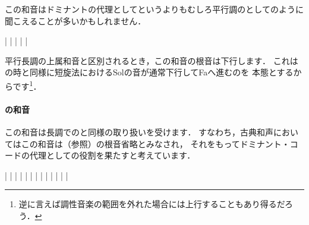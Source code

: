 \documentclass[dvipdfmx,uplatex,b5paper,openany,jbase=12Q,nomag*,textwidth-limit=44%
               ]{gachimuchi}[2020/05/05]
\begin{document}
この和音はドミナントの代理としてというよりもむしろ平行調のとしてのように
聞こえることが多いかもしれません．

\begin{floatMusic}[pos=ht]
  \Startpiece%
  \NOTes
  |%
  \en\bar
  \NOTes
  |%
  \en\bar
  \NOTes
  |%
  \en\setdoublebar
  \endpiece%
\end{floatMusic}

平行長調の上属和音と区別されるとき，この和音の根音は下行します．
これは\Gnv\Min の時と同様に短旋法におけるSol\aNatural の音が通常下行してFa\aNatural へ進むのを
本態とするからです\footnote{
  逆に言えば調性音楽の範囲を外れた場合には上行することもあり得るだろう．
}．

\paragraph{\Gnvii\Dimt の和音}
この和音は長調での\Gnvii\Dimt と同様の取り扱いを受けます．
すなわち，古典和声においてはこの和音は\Gnv{}（参照）の根音省略とみなされ，
それをもってドミナント・コードの代理としての役割を果たすと考えています．

\begin{floatMusic}[pos=ht]
  \Startpiece%
  \znotes|\en
  \NOTes
  |%
  \en\bar
  \NOTEs
  |%
  \en\doublebar
  \NOTes
  \sk%
  |%
  \en\bar
  \NOTEs
  |%
  \en\doublebar
  \NOTes
  |%
  \en\bar
  \NOTEs
  |%
  \en\doublebar
  \NOTes
  |%
  \en\bar
  \NOTEs
  |%
  \en\setdoublebar
  \endpiece%
\end{floatMusic}
\end{document}
